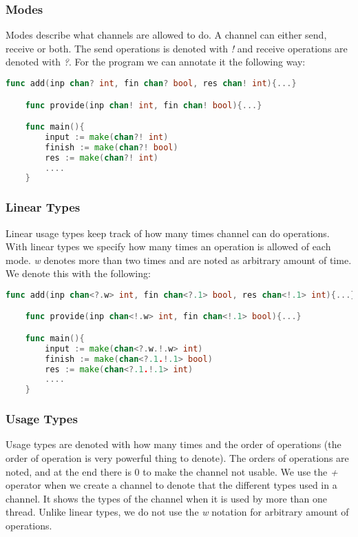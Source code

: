 \subsubsection{Modes}

Modes describe what channels are allowed to do. A channel can either send, receive or both. 
The send operations is denoted with \textit{!} and receive operations are denoted with \textit{?}.
For the program we can annotate it the following way: 

\begin{lstlisting}[language=go]
    func add(inp chan? int, fin chan? bool, res chan! int){...}

    func provide(inp chan! int, fin chan! bool){...}

    func main(){
        input := make(chan?! int)
        finish := make(chan?! bool)
        res := make(chan?! int)
        ....
    }
\end{lstlisting}

\subsubsection{Linear Types}

Linear usage types keep track of how many times channel can do operations. 
With linear types we specify how many times an operation is allowed of each mode. 
\textit{w} denotes more than two times and are noted as arbitrary amount of time. 
We denote this with the following: 

\begin{lstlisting}[language=go]
    func add(inp chan<?.w> int, fin chan<?.1> bool, res chan<!.1> int){...}

    func provide(inp chan<!.w> int, fin chan<!.1> bool){...}

    func main(){
        input := make(chan<?.w.!.w> int)
        finish := make(chan<?.1.!.1> bool)
        res := make(chan<?.1.!.1> int)
        ....
    }
\end{lstlisting}

\subsubsection{Usage Types}
Usage types are denoted with how many times and the order of operations (the order of operation is very powerful thing to denote). 
The orders of operations are noted, and at the end there is 0 to make the channel not usable.
We use the \textit{+} operator when we create a channel to denote that the different types used in a channel. 
It shows the types of the channel when it is used by more than one thread. 
Unlike linear types, we do not use the \textit{w} notation for arbitrary amount of operations. 

